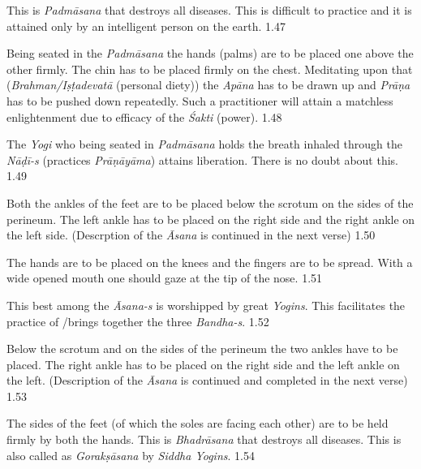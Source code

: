 This is \textit{Padmāsana} that destroys all diseases. This is difficult to practice and it is attained only by an intelligent person on the earth.  1.47


Being seated in the \textit{Padmāsana} the hands (palms) are to be placed one above the other firmly. The chin has to be placed firmly on the chest. Meditating upon that (\textit{Brahman/Iṣṭadevatā} (personal diety)) the \textit{Apāna} has to be drawn up and \textit{Prāṇa} has to be pushed down repeatedly. Such a practitioner will attain a matchless enlightenment due to efficacy of the \textit{Śakti} (power). 1.48


The \textit{Yogi} who being seated in \textit{Padmāsana} holds the breath inhaled through the \textit{Nāḍī-s} (practices \textit{Prāṇāyāma}) attains liberation. There is no doubt about this. 1.49
\medskip


Both the ankles of the feet are to be placed below the scrotum on the sides of the perineum. The left ankle has to be placed on the right side and the right ankle on the left side. (Descrption of the \textit{Āsana} is continued in the next verse) 1.50

The hands are to be placed on the knees and the fingers are to be spread. With a wide opened mouth one should gaze at the tip of the nose. 1.51


This best among the \textit{Āsana-s} is worshipped by great \textit{Yogins}. This facilitates the practice of /brings together the three \textit{Bandha-s}.  1.52
\medskip


Below the scrotum and on the sides of the perineum the two ankles have to be placed. The right ankle has to be placed on the right side and the left ankle on the left. (Description of the \textit{Āsana} is continued and completed in the next verse) 1.53

The sides of the feet (of which the soles are facing each other) are to be held firmly by both the hands. This is \textit{Bhadrāsana} that destroys all diseases. This is also called as \textit{Gorakṣāsana} by \textit{Siddha Yogins}. 1.54
\newpage

